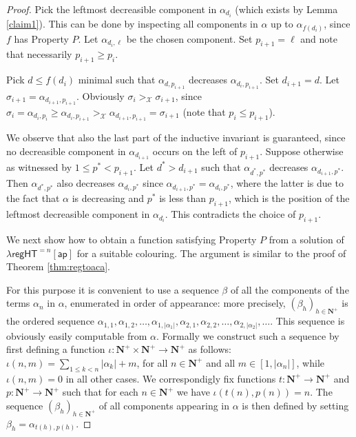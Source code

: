 \documentclass[a4paper,11pt]{article}
\newcommand\Nat{\mathbf{N}}
\newcommand\regHT{\mathsf{regHT}}
\newcommand\ap{\mathsf{ap}}
\begin{document}
\begin{proof}
Pick the leftmost decreasible component in $\alpha_{d_i}$ (which exists by Lemma \ref{claim1}). This can be done by inspecting all components in $\alpha$ up to 
$\alpha_{f(d_i)}$, since $f$ has Property $P$.  Let $\alpha_{d_i, \ell}$ be the chosen component. Set $p_{i+1}=\ell$ and note that necessarily $p_{i+1}\geq p_i$.


Pick $d \leq f(d_i)$ minimal such that $\alpha_{d, p_{i+1}}$
decreases $\alpha_{d_i, p_{i+1}}$. Set $d_{i+1}=d$. 
Let $\sigma_{i+1} = \alpha_{d_{i+1}, p_{i+1}}$. 
Obviously $\sigma_i >_\mathcal{X} \sigma_{i+1}$, since $\sigma_i  = \alpha_{d_i,p_i} \geq \alpha_{d_i,p_{i+1}} >_\mathcal{X} \alpha_{d_{i+1}, p_{i+1}} = \sigma_{i+1}$ (note that $p_i \leq p_{i+1}$).

We observe that also the last part of the inductive invariant is guaranteed, since no decreasible component 
in $\alpha_{d_{i+1}}$ occurs on the left of $p_{i+1}$. 
Suppose otherwise as witnessed by $1\leq p^* < p_{i+1}$. Let $d^* > d_{i+1}$ such that $\alpha_{d^*,p^*}$
decreases $\alpha_{d_{i+1}, p^*}$. Then $\alpha_{d^*, p^*}$ also decreases $\alpha_{d_i, p^*}$ 
since $\alpha_{d_{i+1}, p^*}= \alpha_{d_{i}, p^*}$, where the latter is due to the fact that $\alpha$ is decreasing 
and $p^*$ is less than $p_{i+1}$, which is the position of the leftmost decreasible component in $\alpha_{d_i}$. This contradicts the choice of $p_{i+1}$. 

\bigskip
We next show how to obtain a function satisfying Property $P$ from a solution of $\lambda\regHT^{=n}[\ap]$ for a suitable colouring. The argument is similar to the proof of Theorem \ref{thm:regtoaca}.

For this purpose it is convenient to use a sequence $\beta$ of all the components of the terms $\alpha_n$ in $\alpha$, enumerated in order of appearance: more precisely, $(\beta_h)_{h\in\Nat^+}$ is the ordered sequence $\alpha_{1,1}, \alpha_{1,2}, \dots, \alpha_{1,|\alpha_1|}, \alpha_{2,1}, \alpha_{2,2}, \dots, \alpha_{2,|\alpha_2|}, \dots$. 
This sequence is obviously easily computable from $\alpha$. 
Formally we construct such a sequence by first defining a function $\iota : \Nat^+\times\Nat^+\to \Nat^+$ as follows: $\iota(n,m)= \sum_{1\leq k < n} |\alpha_k| + m$, for all $n\in\Nat^+$ and all $m \in [1, |\alpha_n|]$, while 
$\iota(n,m)=0$ in all other cases. 
We correspondigly fix functions $t: \Nat^+ \to \Nat^+$ and $p:\Nat^+\to\Nat^+$ such that for each $n\in\Nat^+$ we have
$\iota(t(n),p(n))=n$. The sequence $(\beta_h)_{h\in\Nat^+}$ of all components appearing in $\alpha$ is then defined
by setting $\beta_h = \alpha_{t(h),p(h)}$. 



\end{proof}
\end{document}
